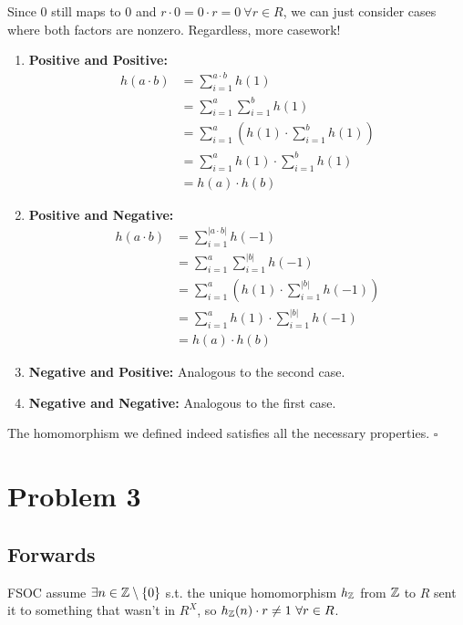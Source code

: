 \documentclass[12pt]{article}
\begin{document}
Since $0$ still maps to $0$ and $r \cdot 0 = 0 \cdot r = 0\ \forall r \in R$,
we can just consider cases where both factors are nonzero.
Regardless, more casework!
\begin{enumerate}
  \item \textbf{Positive and Positive:}
        \begin{align*}
          h(a \cdot b)
           & = \sum_{i=1}^{a \cdot b} h(1)                                \\
           & = \sum_{i=1}^{a} \sum_{i=1}^{b} h(1)                         \\
           & = \sum_{i=1}^{a} \left(h(1) \cdot \sum_{i=1}^{b} h(1)\right) \\
           & = \sum_{i=1}^{a} h(1) \cdot \sum_{i=1}^{b} h(1)              \\
           & = h(a) \cdot h(b)
        \end{align*}
  \item \textbf{Positive and Negative:}
        \begin{align*}
          h(a \cdot b)
           & = \sum_{i=1}^{|a \cdot b|} h(-1)                                \\
           & = \sum_{i=1}^{a} \sum_{i=1}^{|b|} h(-1)                         \\
           & = \sum_{i=1}^{a} \left(h(1) \cdot \sum_{i=1}^{|b|} h(-1)\right) \\
           & = \sum_{i=1}^{a} h(1) \cdot \sum_{i=1}^{|b|} h(-1)              \\
           & = h(a) \cdot h(b)
        \end{align*}
  \item \textbf{Negative and Positive:} Analogous to the second case.
  \item \textbf{Negative and Negative:} Analogous to the first case.
\end{enumerate}
The homomorphism we defined indeed satisfies all the necessary properties. $\square$

\pagebreak

\section{Problem 3}

\subsection{Forwards}

FSOC assume $\exists n \in \mathbb{Z} \setminus \{0\}$ s.t. the unique homomorphism
$h_{\mathbb{Z}}$ from $\mathbb{Z}$ to $R$ sent it to something that wasn't in $R^X$,
so $h_{\mathbb{Z}}(n) \cdot r \ne 1\ \forall r \in R$.
\end{document}
